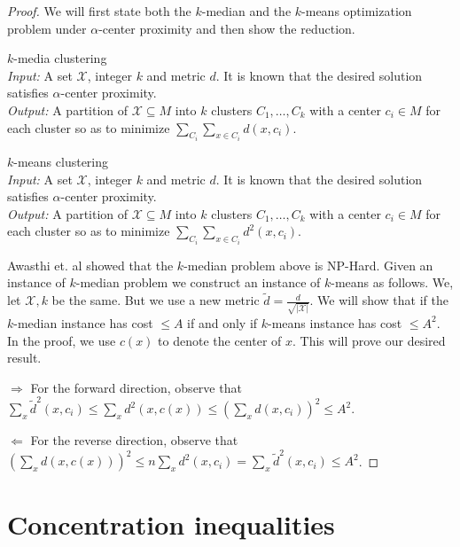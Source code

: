 \documentclass[orivec]{llncs}
\newcommand{\mc}{\mathcal}
\begin{document}
\begin{proof}
We will first state both the $k$-median and the $k$-means optimization problem under $\alpha$-center proximity and then show the reduction.

\vspace{1em}\noindent $k$-media clustering\\
{\it Input:} A set $\mc X$, integer $k$ and metric $d$. It is known that the desired solution satisfies $\alpha$-center proximity.\\
{\it Output:} A partition of $\mc X \subseteq M$ into $k$ clusters $C_1, \ldots, C_k$ with a center $c_i \in M$ for each cluster so as to minimize $\sum_{C_i}\sum_{x \in C_i} d(x, c_i)$.  

\vspace{0.5em}\noindent $k$-means clustering\\
{\it Input:} A set $\mc X$, integer $k$ and metric $d$. It is known that the desired solution satisfies $\alpha$-center proximity.\\
{\it Output:} A partition of $\mc X \subseteq M$ into $k$ clusters $C_1, \ldots, C_k$ with a center $c_i \in M$ for each cluster so as to minimize $\sum_{C_i}\sum_{x \in C_i} d^2(x, c_i)$.  

\vspace{1em}\noindent Awasthi et. al \cite{awasthi2012center} showed that the $k$-median problem above is NP-Hard. Given an instance of $k$-median problem we construct an instance of $k$-means as follows. We, let $\mc X, k$ be the same. But we use a new metric $\tilde d = \frac{d}{\sqrt{|\mc X|}}$. We will show that if the $k$-median instance has cost $\le A$ if and only if $k$-means instance has cost $\le A^2$. In the proof, we use $c(x)$ to denote the center of $x$. This will prove our desired result.

\noindent$\Rightarrow$ For the forward direction, observe that $\sum_x \tilde d^{2}(x, c_i) \le\sum_{x}d^2(x, c(x)) \le (\sum_{x} d(x, c_i))^2 \le A^2$.

\noindent$\Leftarrow$ For the reverse direction, observe that $(\sum_{x}d(x, c(x)))^2 \le n\sum_{x} d^2(x, c_i) = \sum_x \tilde d^{2}(x, c_i) \le A^2$.
\end{proof}








\section{Concentration inequalities}
\label{appendixsection:conIneq}
\end{document}
